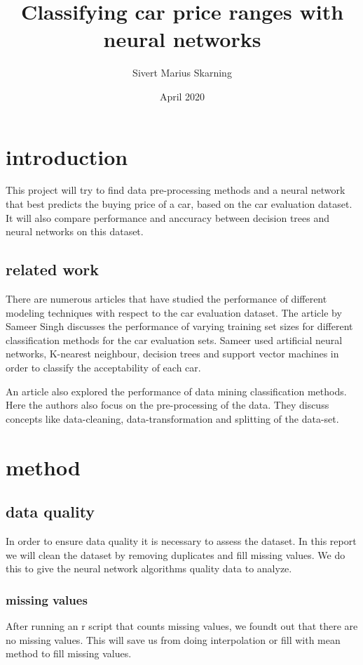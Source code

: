 \documentclass[a4paper, 12pt]{article}
\title{Classifying car price ranges with neural networks}
\author{Sivert Marius Skarning}
\date{April 2020}
\begin{document}
\maketitle
\clearpage
\tableofcontents
\clearpage

\section{introduction}
This project will try to find data pre-processing methods and a neural network that best predicts the buying price of a car, based on the car evaluation dataset.
It will also compare performance and anccuracy between decision trees and neural networks on this dataset.
\subsection{related work}
There are numerous articles that have studied the performance of different modeling techniques with respect to the car evaluation dataset. The article by Sameer Singh\cite{singh2005modeling} discusses the performance of varying training set sizes for different classification methods for the car evaluation sets. Sameer used artificial neural networks, K-nearest neighbour, decision trees and support vector machines in order to classify the acceptability of each car.


An article\cite{perf} also explored the performance of data mining classification methods. Here the authors also focus on the pre-processing of the data. They discuss concepts like data-cleaning, data-transformation and splitting of the data-set.

\section{method}

\subsection{data quality}
In order to ensure data quality it is necessary to assess the dataset. In this report we will clean the dataset by removing duplicates and fill missing values. We do this to give the neural network algorithms quality data to analyze\cite{quality}.
\subsubsection{missing values}
After running an r script that counts missing values, we foundt out that there are no missing values. This will save us from doing interpolation or fill with mean method to fill missing values.
\end{document}
